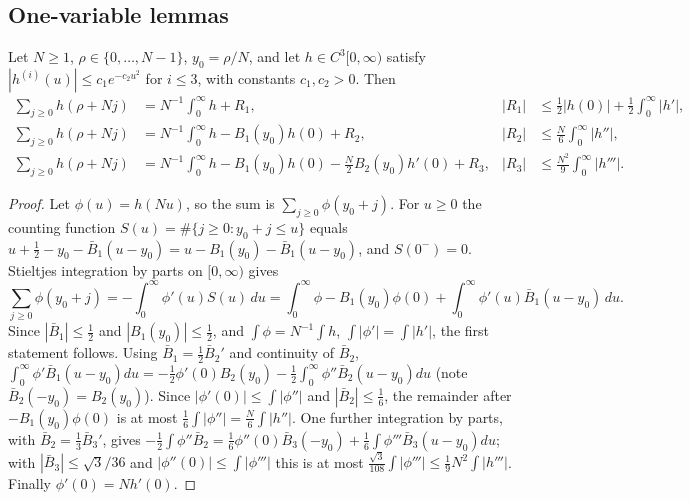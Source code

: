 \subsection{One-variable lemmas}
\begin{lemma}\label{lem:EM1}
Let $N\ge1$, $\rho\in\{0,\dots,N-1\}$, $y_0=\rho/N$, and let $h\in C^3[0,\infty)$ satisfy $|h^{(i)}(u)|\le c_1e^{-c_2u^2}$ for $i\le3$, with constants $c_1,c_2>0$. Then
\begin{align*}
\sum_{j\ge0}h(\rho+Nj)&=N^{-1}\!\int_0^\infty\!h+R_1,&|R_1|&\le\tfrac12|h(0)|+\tfrac12\!\int_0^\infty\!|h'|,\\
\sum_{j\ge0}h(\rho+Nj)&=N^{-1}\!\int_0^\infty\!h-B_1(y_0)h(0)+R_2,&|R_2|&\le\tfrac N6\!\int_0^\infty\!|h''|,\\
\sum_{j\ge0}h(\rho+Nj)&=N^{-1}\!\int_0^\infty\!h-B_1(y_0)h(0)-\tfrac N2B_2(y_0)h'(0)+R_3,&|R_3|&\le\tfrac{N^2}{9}\!\int_0^\infty\!|h'''|.
\end{align*}
\end{lemma}
\begin{proof}
Let $\phi(u)=h(Nu)$, so the sum is $\sum_{j\ge0}\phi(y_0+j)$. For $u\ge0$ the counting function $S(u)=\#\{j\ge0:y_0+j\le u\}$ equals
$u+\tfrac12-y_0-\bar B_1(u-y_0)=u-B_1(y_0)-\bar B_1(u-y_0)$, and $S(0^-)=0$. Stieltjes integration by parts on $[0,\infty)$ gives
\[
\sum_{j\ge0}\phi(y_0+j)=-\int_0^\infty\phi'(u)S(u)\,du=\int_0^\infty\phi-B_1(y_0)\phi(0)+\int_0^\infty\phi'(u)\bar B_1(u-y_0)\,du .
\]
Since $|\bar B_1|\le\frac12$ and $|B_1(y_0)|\le\frac12$, and $\int\phi=N^{-1}\int h$, $\int|\phi'|=\int|h'|$, the first statement follows. Using
$\bar B_1=\frac12\bar B_2'$ and continuity of $\bar B_2$,
$\int_0^\infty\phi'\bar B_1(u-y_0)du=-\frac12\phi'(0)B_2(y_0)-\frac12\int_0^\infty\phi''\bar B_2(u-y_0)du$ (note $\bar B_2(-y_0)=B_2(y_0)$). Since
$|\phi'(0)|\le\int|\phi''|$ and $|\bar B_2|\le\frac16$, the remainder after $-B_1(y_0)\phi(0)$ is at most $\frac16\int|\phi''|=\frac N6\int|h''|$. One further
integration by parts, with $\bar B_2=\frac13\bar B_3'$, gives
$-\frac12\int\phi''\bar B_2=\frac16\phi''(0)\bar B_3(-y_0)+\frac16\int\phi'''\bar B_3(u-y_0)du$; with $|\bar B_3|\le\sqrt3/36$ and $|\phi''(0)|\le\int|\phi'''|$
this is at most $\frac{\sqrt3}{108}\int|\phi'''|\le\frac19N^2\int|h'''|$. Finally $\phi'(0)=Nh'(0)$.
\end{proof}

